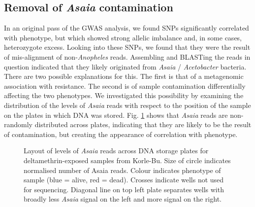 \documentclass[a4paper,12pt]{article}
\begin{document}
\clearpage

\subsection{Removal of \textit{Asaia} contamination}

In an original pass of the GWAS analysis, we found SNPs significantly correlated with phenotype, but which showed strong allelic imbalance and, in some cases, heterozygote excess. Looking into these SNPs, we found that they were the result of mis-alignment of non-\textit{Anopheles} reads. Assembling and BLASTing the reads in question indicated that they likely originated from \textit{Asaia} / \textit{Acetobacter} bacteria. There are two possible explanations for this. The first is that of a metagenomic association with resistance. The second is of sample contamination differentially affecting the two phenotypes. We investigated this possibility by examining the distribution of the levels of \textit{Asaia} reads with respect to the position of the sample on the plates in which DNA was stored. Fig. \ref{FigM6} shows that \textit{Asaia} reads are non-randomly distributed across plates, indicating that they are likely to be the result of contamination, but creating the appearance of correlation with phenotype.

\begin{figure}[h]
	\hspace*{-0.5cm}
	\begin{minipage}{\textwidth}
		\begin{center}
		\end{center}
	\end{minipage}
	\caption{\footnotesize Layout of levels of \textit{Asaia} reads across DNA storage plates for deltamethrin-exposed samples from Korle-Bu. Size of circle indicates normalised number of Asaia reads. Colour indicates phenotype of sample (blue = alive, red = dead). Crosses indicate wells not used for sequencing. Diagonal line on top left plate separates wells with broadly less \textit{Asaia} signal on the left and more signal on the right. }
	\label{FigM6}
\end{figure}
\end{document}

